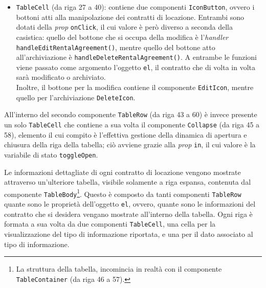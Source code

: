 \begin{itemize}
    \item \texttt{TableCell} (da riga 27 a 40): contiene due componenti \texttt{IconButton}, ovvero i bottoni atti alla manipolazione dei contratti di locazione. Entrambi sono dotati della \textit{prop} \texttt{onClick}, il cui valore è però diverso a seconda della casistica: quello del bottone che si occupa della modifica è l'\textit{handler} \texttt{handleEditRentalAgreement()}, mentre quello del bottone atto all'archiviazione è \texttt{handleDeleteRentalAgreement()}. A entrambe le funzioni viene passato come argomento l'oggetto \texttt{el}, il contratto che di volta in volta sarà modificato o archiviato.\\
    Inoltre, il bottone per la modifica contiene il componente \texttt{EditIcon}, mentre quello per l'archiviazione \texttt{DeleteIcon}.
\end{itemize}
All'interno del secondo componente \texttt{TableRow} (da riga 43 a 60) è invece presente un solo \texttt{TableCell} che contiene a sua volta il componente \texttt{Collapse} (da riga 45 a 58), elemento il cui compito è l'effettiva gestione della dinamica di apertura e chiusura della riga della tabella; ciò avviene grazie alla \textit{prop} \texttt{in}, il cui valore è la variabile di stato \texttt{toggleOpen}.

Le informazioni dettagliate di ogni contratto di locazione vengono mostrate attraverso un'ulteriore tabella, visibile solamente a riga espansa, contenuta dal componente \texttt{TableBody}\footnote{La struttura della tabella, incomincia in realtà con il componente \texttt{TableContainer} (da riga 46 a 57).}. Questo è composto da tanti componenti \texttt{TableRow} quante sono le proprietà dell'oggetto \texttt{el}, ovvero, quante sono le informazioni del contratto che si desidera vengano mostrate all'interno della tabella. Ogni riga è formata a sua volta da due componenti \texttt{TableCell}, una cella per la visualizzazione del tipo di informazione riportata, e una per il dato associato al tipo di informazione. 



